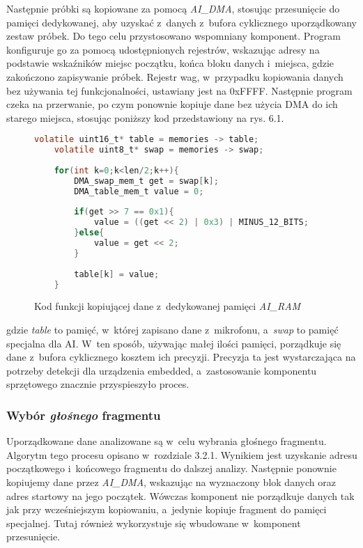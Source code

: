 Następnie próbki są kopiowane za pomocą \textit{AI\_DMA}, stosując przesunięcie do pamięci dedykowanej, aby uzyskać z~danych z~bufora cyklicznego uporządkowany zestaw próbek. Do tego celu przystosowano wspomniany komponent. Program konfiguruje go za pomocą udostępnionych rejestrów, wskazując adresy na podstawie wskaźników miejsc początku, końca bloku danych i~miejsca, gdzie zakończono zapisywanie próbek. Rejestr wag, w~przypadku kopiowania danych bez używania tej funkcjonalności, ustawiany jest na 0xFFFF. Następnie program czeka na przerwanie, po czym ponownie kopiuje dane bez użycia DMA do ich starego miejsca, stosując poniższy kod przedstawiony na rys. 6.1.


\begin{figure}[h]
\begin{lstlisting}[language=C]
	volatile uint16_t* table = memories -> table;
	volatile uint8_t* swap = memories -> swap;
	
	for(int k=0;k<len/2;k++){
		DMA_swap_mem_t get = swap[k];
		DMA_table_mem_t value = 0;
		
		if(get >> 7 == 0x1){
			value = ((get << 2) | 0x3) | MINUS_12_BITS;
		}else{
			value = get << 2;
		}
		
		table[k] = value;
	}
\end{lstlisting}
\caption{Kod funkcji kopiującej dane z~dedykowanej pamięci \textit{AI\_RAM}}
\end{figure}
\FloatBarrier %

gdzie \textit{table} to pamięć, w~której zapisano dane z~mikrofonu, a~\textit{swap} to pamięć specjalna dla AI. W~ten sposób, używając małej ilości pamięci, porządkuje się dane z~bufora cyklicznego kosztem ich precyzji. Precyzja ta jest wystarczająca na potrzeby detekcji dla urządzenia embedded, a~zastosowanie komponentu sprzętowego znacznie przyspieszyło proces.

\subsubsection{Wybór \textit{głośnego} fragmentu}

Uporządkowane dane analizowane są w~celu wybrania głośnego fragmentu. Algorytm tego procesu opisano w~rozdziale 3.2.1. Wynikiem jest uzyskanie adresu początkowego i~końcowego fragmentu do dalszej analizy. Następnie ponownie kopiujemy dane przez \textit{AI\_DMA}, wskazując na wyznaczony blok danych oraz adres startowy na jego początek. Wówczas komponent nie porządkuje danych tak jak przy wcześniejszym kopiowaniu, a~jedynie kopiuje fragment do pamięci specjalnej. Tutaj również wykorzystuje się wbudowane w~komponent przesunięcie.

